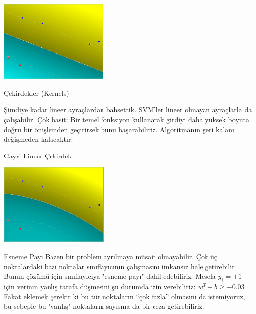 \documentclass[12pt,fleqn]{article}\usepackage{../../common}
\begin{document}
\includegraphics[height=4cm]{svmlinear.png}

Çekirdekler (Kernels)

Şimdiye kadar lineer ayraçlardan bahsettik.  SVM'ler lineer olmayan
ayraçlarla da çalışabilir.  Çok basit: Bir temel fonksiyon kullanarak
girdiyi daha yüksek boyuta doğru bir önişlemden geçirirsek bunu
başarabiliriz.  Algoritmanın geri kalanı değişmeden kalacaktır.

Gayri Lineer Çekirdek

\includegraphics[height=4cm]{svmpoly.png}

Esneme Payı Bazen bir problem ayrılmaya müsait olmayabilir.  Çok üç
noktalardaki bazı noktalar sınıflayıcının çalışmasını imkansız hale
getirebilir Bunun çözümü için sınıflayıcıya "esneme payı" dahil
edebiliriz.  Mesela $y_{i}=+1$ için verinin yanlış tarafa düşmesini şu
durumda izin verebiliriz: $w^{T}+b \geq -0.03$ Fakat eklemek gerekir
ki bu tür noktaların ``çok fazla'' olmasını da istemiyoruz, bu sebeple
bu "yanlış" noktaların sayısına da bir ceza getirebiliriz.
\end{document}
